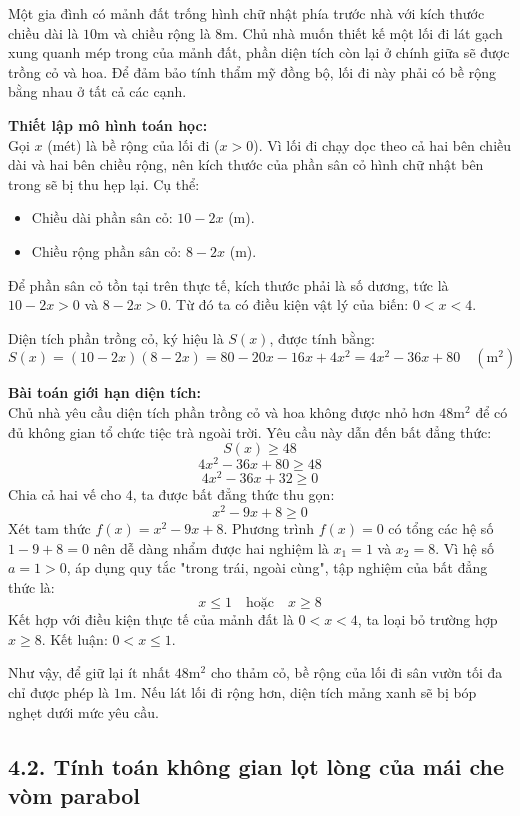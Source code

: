 \documentclass[14pt, a4paper, oneside]{extreport}
\begin{document}
Một gia đình có mảnh đất trống hình chữ nhật phía trước nhà với kích thước chiều dài là $10\text{m}$ và chiều rộng là $8\text{m}$. Chủ nhà muốn thiết kế một lối đi lát gạch xung quanh mép trong của mảnh đất, phần diện tích còn lại ở chính giữa sẽ được trồng cỏ và hoa. Để đảm bảo tính thẩm mỹ đồng bộ, lối đi này phải có bề rộng bằng nhau ở tất cả các cạnh.

\textbf{Thiết lập mô hình toán học:} \\
Gọi $x$ (mét) là bề rộng của lối đi ($x > 0$). Vì lối đi chạy dọc theo cả hai bên chiều dài và hai bên chiều rộng, nên kích thước của phần sân cỏ hình chữ nhật bên trong sẽ bị thu hẹp lại. Cụ thể:
\begin{itemize}
    \item Chiều dài phần sân cỏ: $10 - 2x$ (m).
    \item Chiều rộng phần sân cỏ: $8 - 2x$ (m).
\end{itemize}
Để phần sân cỏ tồn tại trên thực tế, kích thước phải là số dương, tức là $10 - 2x > 0$ và $8 - 2x > 0$. Từ đó ta có điều kiện vật lý của biến: $0 < x < 4$.

Diện tích phần trồng cỏ, ký hiệu là $S(x)$, được tính bằng:
\[ S(x) = (10 - 2x)(8 - 2x) = 80 - 20x - 16x + 4x^2 = 4x^2 - 36x + 80 \quad (\text{m}^2) \]

\textbf{Bài toán giới hạn diện tích:} \\
Chủ nhà yêu cầu diện tích phần trồng cỏ và hoa không được nhỏ hơn $48\text{m}^2$ để có đủ không gian tổ chức tiệc trà ngoài trời. Yêu cầu này dẫn đến bất đẳng thức:
\[ S(x) \ge 48 \]
\[ 4x^2 - 36x + 80 \ge 48 \]
\[ 4x^2 - 36x + 32 \ge 0 \]
Chia cả hai vế cho $4$, ta được bất đẳng thức thu gọn:
\[ x^2 - 9x + 8 \ge 0 \]
Xét tam thức $f(x) = x^2 - 9x + 8$. Phương trình $f(x) = 0$ có tổng các hệ số $1 - 9 + 8 = 0$ nên dễ dàng nhẩm được hai nghiệm là $x_1 = 1$ và $x_2 = 8$. Vì hệ số $a = 1 > 0$, áp dụng quy tắc "trong trái, ngoài cùng", tập nghiệm của bất đẳng thức là:
\[ x \le 1 \quad \text{hoặc} \quad x \ge 8 \]
Kết hợp với điều kiện thực tế của mảnh đất là $0 < x < 4$, ta loại bỏ trường hợp $x \ge 8$. 
Kết luận: $0 < x \le 1$. 

Như vậy, để giữ lại ít nhất $48\text{m}^2$ cho thảm cỏ, bề rộng của lối đi sân vườn tối đa chỉ được phép là $1\text{m}$. Nếu lát lối đi rộng hơn, diện tích mảng xanh sẽ bị bóp nghẹt dưới mức yêu cầu.

\subsection*{4.2. Tính toán không gian lọt lòng của mái che vòm parabol}
\end{document}
